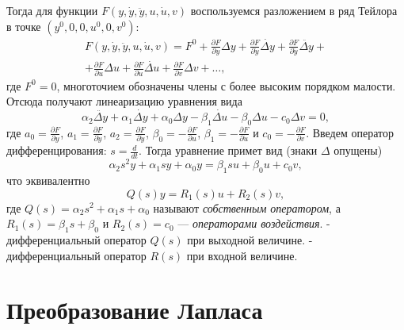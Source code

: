 \documentclass[../../TAU.tex]{subfiles}
\begin{document}
    Тогда для функции
    $F(y,\dot y, \ddot y, u, \dot u, v)$ 
    воспользуемся разложением в ряд Тейлора в точке 
    $(y^0, 0,0, u^0, 0, v^0)$:
    \begin{multline}
        F(y,\dot y, \ddot y, u, \dot u, v) = F^0 + \frac{\partial F}{\partial y} \Delta y +\frac{\partial F}{\partial \dot y} \dot{\Delta y}+ \frac{\partial F}{\partial \ddot y} \ddot{\Delta y} +\\  + \frac{\partial F}{\partial u} \Delta u + \frac{\partial F}{\partial \dot u } \dot{\Delta u} + \frac{\partial F}{\partial v} \Delta v + \ldots,
    \end{multline}
    где $F^0= 0$, многоточием обозначены члены с более высоким порядком малости.
    Отсюда получают линеаризацию уравнения 
    вида
    \begin{equation}\label{EQ_LINEAR}
        \alpha_2\ddot{\Delta y} + \alpha_1 \dot{\Delta y} + \alpha_0 \Delta y - \beta_1\dot{\Delta u} - \beta_0\Delta u - c_0 \Delta v = 0,
    \end{equation}
    где 
    $a_0 = \frac{\partial F}{\partial y}$, 
    $a_1 = \frac{\partial F}{\partial \dot y}$, $a_2 = \frac{\partial F}{\partial \ddot y}$, 
    $\beta_0 = -\frac{\partial F}{\partial u}$, 
    $\beta_1 = -\frac{\partial F}{\partial \dot u }$ и 
    $c_0 = -\frac{\partial F}{\partial v}$.
    Введем оператор дифференцирования: 
    $s = \frac{d}{dt}$.
    Тогда уравнение 
     примет вид (знаки $\Delta$ опущены)
    \begin{equation}
        \alpha_2 s^2 y + \alpha_1 s y + \alpha_0 y = \beta_1 s u + \beta_0 u + c_0 v,
    \end{equation}
    что эквивалентно
    \begin{equation}
        Q(s) y = R_1(s)u + R_2(s)v,
    \end{equation}
    где 
    $Q(s) = \alpha_2s^2 + \alpha_1 s + \alpha_0$ 
    называют {\it собственным оператором}, а 
    $R_1(s) = \beta_1s+\beta_0$ и 
    $R_2(s) = c_0$
     --- {\it операторами воздействия}.
     - дифференциальный оператор $Q(s)$ при выходной величине.
     - дифференциальный оператор $R(s)$ при входной величине.
    
\section{Преобразование Лапласа}
\end{document}
